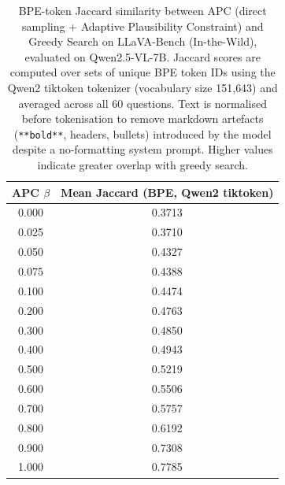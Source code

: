 \documentclass[11pt]{article}
\begin{document}
\begin{table}[ht]
\centering
\caption{BPE-token Jaccard similarity between APC (direct sampling + Adaptive Plausibility
Constraint) and Greedy Search on LLaVA-Bench (In-the-Wild), evaluated on Qwen2.5-VL-7B.
Jaccard scores are computed over sets of unique BPE token IDs using the Qwen2 tiktoken
tokenizer (vocabulary size 151{,}643) and averaged across all 60 questions. Text is
normalised before tokenisation to remove markdown artefacts (\texttt{**bold**}, headers,
bullets) introduced by the model despite a no-formatting system prompt. Higher values
indicate greater overlap with greedy search.}
\label{tab:qwen_jaccard_apc_greedy}

\setlength{\tabcolsep}{10pt}
\renewcommand{\arraystretch}{1.2}

\begin{tabular}{cc}
\toprule
\textbf{APC $\beta$} & \textbf{Mean Jaccard (BPE, Qwen2 tiktoken)} \\
\midrule
0.000 & 0.3713 \\
0.025 & 0.3710 \\
0.050 & 0.4327 \\
0.075 & 0.4388 \\
0.100 & 0.4474 \\
0.200 & 0.4763 \\
0.300 & 0.4850 \\
0.400 & 0.4943 \\
0.500 & 0.5219 \\
0.600 & 0.5506 \\
0.700 & 0.5757 \\
0.800 & 0.6192 \\
0.900 & 0.7308 \\
1.000 & 0.7785 \\
\bottomrule
\end{tabular}

\end{table}

\bigskip
\end{document}
